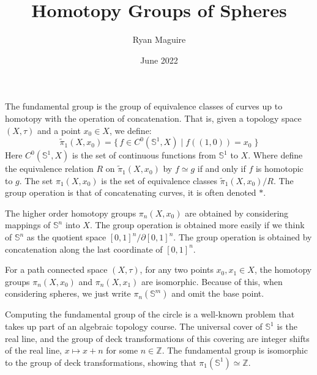 \documentclass{beamer}
\title{Homotopy Groups of Spheres}
\author{Ryan Maguire}
\date{June 2022}
\begin{document}
    \maketitle
    \begin{frame}
        The fundamental group is the group of equivalence classes of curves up
        to homotopy with the operation of concatenation. That is, given a
        topology space $(X,\tau)$ and a point $x_{0}\in{X}$, we define:
        \begin{equation}
            \tilde{\pi}_{1}(X,x_{0})=
                \{\,f\in{C}^{0}(\mathbb{S}^{1},X)\;|\;
                    f((1,0))=x_{0}\;\}
        \end{equation}
        Here $C^{0}(\mathbb{S}^{1},X)$ is the set of continuous functions from
        $\mathbb{S}^{1}$ to $X$. Where define the equivalence relation
        $R$ on $\tilde{\pi}_{1}(X,x_{0})$ by $f\simeq{g}$ if and only if $f$ is
        homotopic to $g$. The set $\pi_{1}(X,x_{0})$ is the set of equivalence
        classes $\tilde{\pi}_{1}(X,x_{0})/R$. The group operation is that of
        concatenating curves, it is often denoted $*$.
    \end{frame}
    \begin{frame}
        The higher order homotopy groups $\pi_{n}(X,x_{0})$ are obtained by
        considering mappings of $\mathbb{S}^{n}$ into $X$. The group operation
        is obtained more easily if we think of $\mathbb{S}^{n}$ as the quotient
        space $[0,1]^{n}/\partial[0,1]^{n}$. The group operation is obtained by
        concatenation along the last coordinate of $[0,1]^{n}$.
        \par\hfill\par
        For a path connected space $(X,\tau)$, for any two points
        $x_{0},x_{1}\in{X}$, the homotopy groups
        $\pi_{n}(X,x_{0})$ and $\pi_{n}(X,x_{1})$ are isomorphic. Because of
        this, when considering spheres, we just write $\pi_{n}(\mathbb{S}^{m})$
        and omit the base point.
    \end{frame}
    \begin{frame}
        Computing the fundamental group of the circle is a well-known problem
        that takes up part of an algebraic topology course. The universal cover
        of $\mathbb{S}^{1}$ is the real line, and the group of deck
        transformations of this covering are integer shifts of the real line,
        $x\mapsto{x}+n$ for some $n\in\mathbb{Z}$. The fundamental group is
        isomorphic to the group of deck transformations, showing that
        $\pi_{1}(\mathbb{S}^{1})\simeq\mathbb{Z}$.
    \end{frame}
\end{document}

